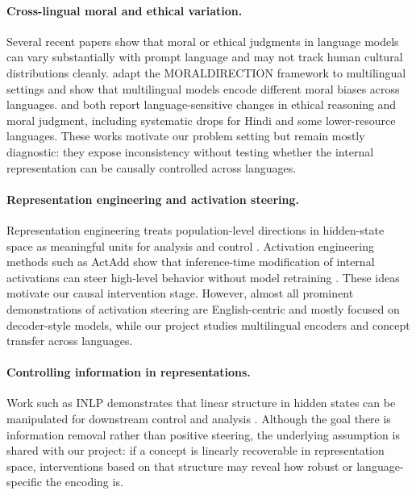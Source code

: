 \documentclass[11pt]{article}
\begin{document}
\paragraph{Cross-lingual moral and ethical variation.}
Several recent papers show that moral or ethical judgments in language models can vary substantially with prompt language and may not track human cultural distributions cleanly. \citet{hammerl2023moralbias} adapt the \textsc{MORALDIRECTION} framework to multilingual settings and show that multilingual models encode different moral biases across languages. \citet{agarwal2024ethical} and \citet{khandelwal2024dit} both report language-sensitive changes in ethical reasoning and moral judgment, including systematic drops for Hindi and some lower-resource languages. These works motivate our problem setting but remain mostly diagnostic: they expose inconsistency without testing whether the internal representation can be causally controlled across languages.

\paragraph{Representation engineering and activation steering.}
Representation engineering treats population-level directions in hidden-state space as meaningful units for analysis and control \citep{zou2023repe}. Activation engineering methods such as ActAdd show that inference-time modification of internal activations can steer high-level behavior without model retraining \citep{turner2023actadd}. These ideas motivate our causal intervention stage. However, almost all prominent demonstrations of activation steering are English-centric and mostly focused on decoder-style models, while our project studies multilingual encoders and concept transfer across languages.

\paragraph{Controlling information in representations.}
Work such as INLP demonstrates that linear structure in hidden states can be manipulated for downstream control and analysis \citep{ravfogel2020null}. Although the goal there is information removal rather than positive steering, the underlying assumption is shared with our project: if a concept is linearly recoverable in representation space, interventions based on that structure may reveal how robust or language-specific the encoding is.
\end{document}
